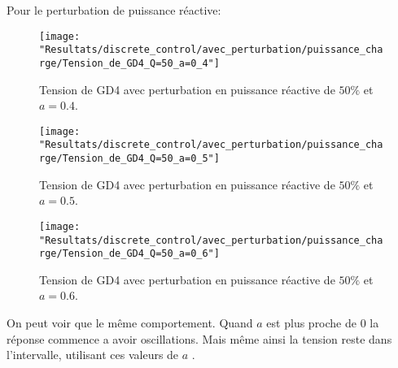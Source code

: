 Pour le perturbation de puissance réactive:

\begin{minipage}{.455\textwidth}
	\begin{figure}[H]
		\begin{center}
			\captionsetup{justification=centering,margin=.5cm}	
			\texttt{[image: "Resultats/discrete\_control/avec\_perturbation/puissance\_charge/Tension\_de\_GD4\_Q=50\_a=0\_4"]}
			\caption{Tension de GD4 avec perturbation en puissance réactive de $ 50\% $ et $ a =0.4$.}
			\label{fig:Tension_de_GD4_Q=50_a=0_4}
		\end{center}
	\end{figure}
\end{minipage}
\begin{minipage}{.455\textwidth}
	\begin{figure}[H]
		\begin{center}
			\captionsetup{justification=centering,margin=.5cm}	
			\texttt{[image: "Resultats/discrete\_control/avec\_perturbation/puissance\_charge/Tension\_de\_GD4\_Q=50\_a=0\_5"]}
			\caption{Tension de GD4 avec perturbation en puissance réactive de $ 50\% $ et $ a =0.5$.}
			\label{fig:Tension_de_GD4_Q=50_a=0_5}
		\end{center}
	\end{figure}
\end{minipage}
\begin{figure}[H]
	\begin{center}
		\captionsetup{justification=centering,margin=4.5cm}		
		\texttt{[image: "Resultats/discrete\_control/avec\_perturbation/puissance\_charge/Tension\_de\_GD4\_Q=50\_a=0\_6"]}
		\caption{Tension de GD4 avec perturbation en puissance réactive de $ 50\% $ et $ a =0.6$.}
		\label{fig:Tension_de_GD4_Q=50_a=0_6}
	\end{center}
\end{figure}

On peut voir que le même comportement. Quand $ a $ est plus proche de 0 la réponse commence a avoir oscillations. Mais même ainsi la tension reste dans l'intervalle, utilisant ces valeurs de $ a $ .
 														
 														
 
